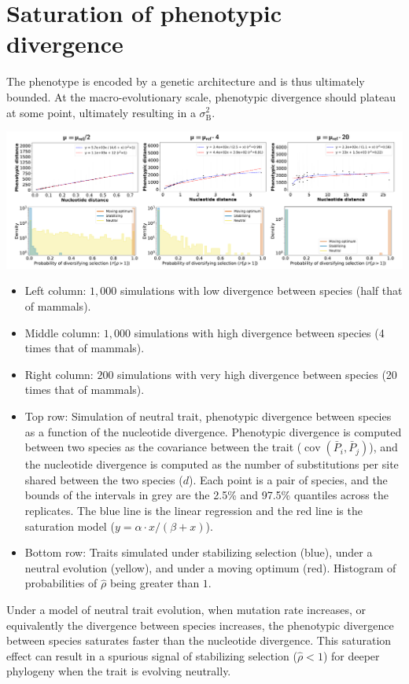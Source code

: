 \documentclass{article}
\newcommand{\Multiply}{\cdot}
\DeclareMathOperator{\Cov}{\text{cov}}
\newcommand{\Spi}{i}
\newcommand{\Spj}{j}
\newcommand{\Trait}{P}
\newcommand{\MeanTrait}{\bar{\Trait}}
\newcommand{\VarPhy}{\Cov \left( \MeanTrait_{\Spi}, \MeanTrait_{\Spj}\right)}
\newcommand{\RateBetween}{\sigma^2_{\mathrm{B}}}
\newcommand{\EstNI}{\widehat{\rho}}
\begin{document}
\newpage
\section{Saturation of phenotypic divergence}\label{sec:supp-distance}

The phenotype is encoded by a genetic architecture and is thus ultimately bounded.
At the macro-evolutionary scale, phenotypic divergence should plateau at some point, ultimately resulting in a $\RateBetween$.

\begin{center}
    \includegraphics[width=1.0\textwidth, page=1] {figureS2}
    \label{fig:supp-distance}
\end{center}
\begin{itemize}
    \item Left column: $1,000$ simulations with low divergence between species (half that of mammals).
    \item Middle column: $1,000$ simulations with high divergence between species (4 times that of mammals).
    \item Right column: $200$ simulations with very high divergence between species (20 times that of mammals).
    \item Top row: Simulation of neutral trait, phenotypic divergence between species as a function of the nucleotide divergence. Phenotypic divergence is computed between two species as the covariance between the trait ($\VarPhy$), and the nucleotide divergence is computed as the number of substitutions per site shared between the two species ($d$). Each point is a pair of species, and the bounds of the intervals in grey are the 2.5\% and 97.5\% quantiles across the replicates. The blue line is the linear regression and the red line is the saturation model ($y = \alpha \Multiply x / (\beta + x)$).
    \item Bottom row: Traits simulated under stabilizing selection (blue), under a neutral evolution (yellow), and under a moving optimum (red). Histogram of probabilities of $\EstNI$ being greater than $1$.
\end{itemize}
Under a model of neutral trait evolution, when mutation rate increases, or equivalently the divergence between species increases, the phenotypic divergence between species saturates faster than the nucleotide divergence.
This saturation effect can result in a spurious signal of stabilizing selection ($\EstNI < 1$) for deeper phylogeny when the trait is evolving neutrally.
\end{document}
